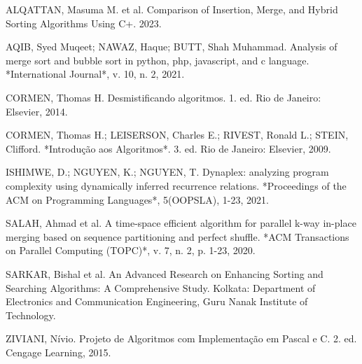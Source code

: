 \documentclass{SBCbookchapter}
\begin{document}
\begin{thebibliography}{99}

ALQATTAN, Masuma M. et al. Comparison of Insertion, Merge, and Hybrid Sorting Algorithms Using C+. 2023.

AQIB, Syed Muqeet; NAWAZ, Haque; BUTT, Shah Muhammad. Analysis of merge sort and bubble sort in python, php, javascript, and c language. *International Journal*, v. 10, n. 2, 2021.

CORMEN, Thomas H. Desmistificando algoritmos. 1. ed. Rio de Janeiro: Elsevier, 2014.

CORMEN, Thomas H.; LEISERSON, Charles E.; RIVEST, Ronald L.; STEIN, Clifford. *Introdução aos Algoritmos*. 3. ed. Rio de Janeiro: Elsevier, 2009.

ISHIMWE, D.; NGUYEN, K.; NGUYEN, T. Dynaplex: analyzing program complexity using dynamically inferred recurrence relations. *Proceedings of the ACM on Programming Languages*, 5(OOPSLA), 1-23, 2021.

SALAH, Ahmad et al. A time-space efficient algorithm for parallel k-way in-place merging based on sequence partitioning and perfect shuffle. *ACM Transactions on Parallel Computing (TOPC)*, v. 7, n. 2, p. 1-23, 2020.

SARKAR, Bishal et al. An Advanced Research on Enhancing Sorting and Searching Algorithms: A Comprehensive Study. Kolkata: Department of Electronics and Communication Engineering, Guru Nanak Institute of Technology.

ZIVIANI, Nívio. Projeto de Algoritmos com Implementação em Pascal e C. 2. ed. Cengage Learning, 2015.

\end{thebibliography}
\end{document}
